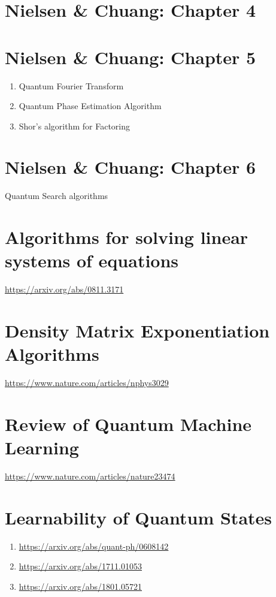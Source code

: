 \documentclass[11pt]{article}
\newcommand\0{\mathbf{0}}
\newcommand\<{\langle}
\renewcommand\>{\rangle}
\begin{document}
\section{Nielsen \& Chuang: Chapter 4}

\section{Nielsen \& Chuang: Chapter 5}

\begin{enumerate}
\item Quantum Fourier Transform
\item Quantum Phase Estimation Algorithm
\item Shor's algorithm for Factoring
\end{enumerate}

\section{Nielsen \& Chuang: Chapter 6}

Quantum Search algorithms

\section{Algorithms for solving linear systems of equations}
\url{https://arxiv.org/abs/0811.3171}

\section{Density Matrix Exponentiation Algorithms}
\url{https://www.nature.com/articles/nphys3029}

\section{Review of Quantum Machine Learning}
\url{https://www.nature.com/articles/nature23474}

\section{Learnability of Quantum States}
\begin{enumerate}
\item \url{https://arxiv.org/abs/quant-ph/0608142}
\item \url{https://arxiv.org/abs/1711.01053}
\item \url{https://arxiv.org/abs/1801.05721}
\end{enumerate}
\end{document}
